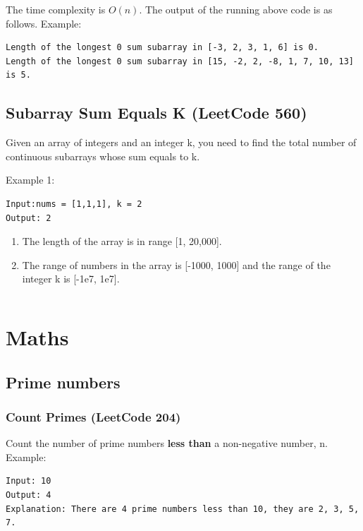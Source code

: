 \documentclass[11pt]{article}
\begin{document}
\inputminted[breaklines=true,frame=leftline, linenos=true]{python}{src/findLongestSubarraySum0.py}

The time complexity is $O(n)$.
The output of the running above code is as follows. 
Example:
\begin{verbatim}
Length of the longest 0 sum subarray in [-3, 2, 3, 1, 6] is 0.
Length of the longest 0 sum subarray in [15, -2, 2, -8, 1, 7, 10, 13] is 5.
\end{verbatim}

\subsection{Subarray Sum Equals K (LeetCode 560)}
Given an array of integers and an integer k, you need to find the total number of continuous subarrays whose sum equals to k.

Example 1:
\begin{verbatim}
Input:nums = [1,1,1], k = 2
Output: 2	
\end{verbatim}

\begin{enumerate} 
\item The length of the array is in range [1, 20,000].
\item The range of numbers in the array is [-1000, 1000] and the range of the integer k is [-1e7, 1e7].	
\end{enumerate}

\inputminted[breaklines=true,frame=leftline, linenos=true]{python}{src/subarraySum.py}

\section{Maths}
\subsection{Prime numbers}
\subsubsection{Count Primes (LeetCode 204)}
Count the number of prime numbers \textbf{less than} a non-negative number, n.
Example:
\begin{verbatim}
Input: 10
Output: 4
Explanation: There are 4 prime numbers less than 10, they are 2, 3, 5, 7.
\end{verbatim}
\end{document}
